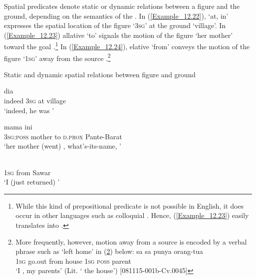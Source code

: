 Spatial  predicates denote static or dynamic relations between a figure and the ground, depending on the semantics of the . In (\ref{Example_12.22}),   ‘at, in’ expresses the spatial location of the figure  ‘\textsc{3sg}’ at the ground  ‘village’. In (\ref{Example_12.23}) allative  ‘to’ signals the motion of the figure  ‘her mother’ toward the goal .\footnote{While this kind of prepositional predicate is not possible in English, it does occur in other languages such as colloquial . Hence, (\ref{Example_12.23}) easily translates into .} In (\ref{Example_12.24}), elative  ‘from’ conveys the motion of the figure  ‘1\textsc{sg}’ away from the source .\footnote{More frequently, however, motion away from a source is encoded by a verbal phrase such as  ‘left home’ in (\ref{Footnote_Example_12.1}) below:
\vspace{-5pt}
\ea
\label{Footnote_Example_12.1}
\gll sa    sa punya orang-tua\\
\textsc{1sg} go.out from house \textsc{1sg} \textsc{poss} parent\\
\glt ‘I , my parents’ (Lit. ‘ the house’) [081115-001b-Cv.0045]
\z
}

\begin{styleExampleTitle}
Static and dynamic spatial  relations between figure and ground
\end{styleExampleTitle}

\ea
\label{Example_12.22}
 {dia} {} {}\\ %
 indeed  \textsc{3sg}  at  village\\
\glt 
‘indeed, he was ’ \textstyleExampleSource{[080918-001-CvNP.0014]}
\z

\ea
\label{Example_12.23}
 {mama} {} {ini} {}\\ %
 \textsc{3sg}:\textsc{poss}  mother  to  \textsc{d.prox}  Pante-Barat\\
\glt 
‘her mother (went) , what’s-its-name, ’ \textstyleExampleSource{[080919-006-CvNP.025]}
\z

\ea
\label{Example_12.24}
 {} {}\\ %
 \textsc{1sg}  from  Sawar\\
\glt 
‘I (just returned) ’ \textstyleExampleSource{[080927-004-CvNP.0003]}
\z


